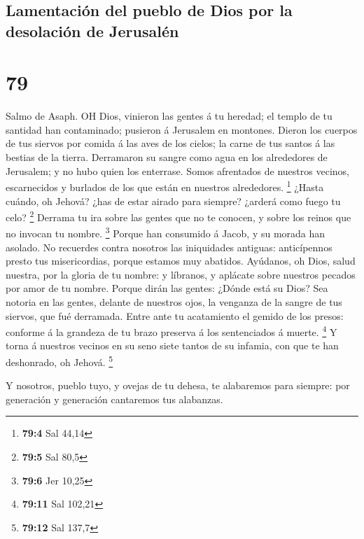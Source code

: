 \hypertarget{lamentaciuxf3n-del-pueblo-de-dios-por-la-desolaciuxf3n-de-jerusaluxe9n}{%
\subsection{Lamentación del pueblo de Dios por la desolación de
Jerusalén}\label{lamentaciuxf3n-del-pueblo-de-dios-por-la-desolaciuxf3n-de-jerusaluxe9n}}

\hypertarget{section-78}{%
\section{79}\label{section-78}}

 Salmo de Asaph. OH Dios, vinieron las gentes á tu heredad;
el templo de tu santidad han contaminado; pusieron á Jerusalem en
montones.  Dieron los cuerpos de tus siervos por comida á
las aves de los cielos; la carne de tus santos á las bestias de la
tierra.  Derramaron su sangre como agua en los alrededores
de Jerusalem; y no hubo quien los enterrase.  Somos
afrentados de nuestros vecinos, escarnecidos y burlados de los que están
en nuestros alrededores. \footnote{\textbf{79:4} Sal 44,14} 
¿Hasta cuándo, oh Jehová? ¿has de estar airado para siempre? ¿arderá
como fuego tu celo? \footnote{\textbf{79:5} Sal 80,5} 
Derrama tu ira sobre las gentes que no te conocen, y sobre los reinos
que no invocan tu nombre. \footnote{\textbf{79:6} Jer 10,25}
 Porque han consumido á Jacob, y su morada han asolado.
 No recuerdes contra nosotros las iniquidades antiguas:
anticípennos presto tus misericordias, porque estamos muy abatidos.
 Ayúdanos, oh Dios, salud nuestra, por la gloria de tu
nombre: y líbranos, y aplácate sobre nuestros pecados por amor de tu
nombre.  Porque dirán las gentes: ¿Dónde está su Dios? Sea
notoria en las gentes, delante de nuestros ojos, la venganza de la
sangre de tus siervos, que fué derramada.  Entre ante tu
acatamiento el gemido de los presos: conforme á la grandeza de tu brazo
preserva á los sentenciados á muerte. \footnote{\textbf{79:11} Sal
  102,21}  Y torna á nuestros vecinos en su seno siete
tantos de su infamia, con que te han deshonrado, oh Jehová. \footnote{\textbf{79:12}
  Sal 137,7}

 Y nosotros, pueblo tuyo, y ovejas de tu dehesa, te
alabaremos para siempre: por generación y generación cantaremos tus
alabanzas.

